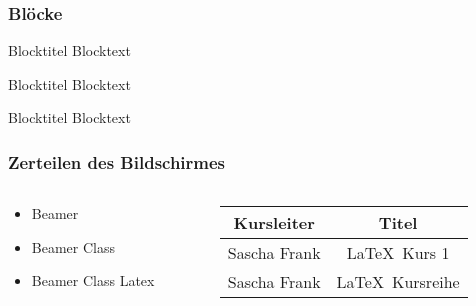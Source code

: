 \documentclass{beamer}
\begin{document}
\begin{frame}\frametitle{Bl\"ocke}

\begin{block}{Blocktitel}
Blocktext 
\end{block}

\begin{exampleblock}{Blocktitel}
Blocktext 
\end{exampleblock}


\begin{alertblock}{Blocktitel}
Blocktext 
\end{alertblock}
\end{frame}


\begin{frame}\frametitle{Zerteilen des Bildschirmes}
\begin{columns}
\begin{column}{5cm}
\begin{itemize}
\item Beamer 
\item Beamer Class 
\item Beamer Class Latex 
\end{itemize}
\end{column}
\begin{column}{5cm}
\begin{tabular}{|c|c|}
\hline
\textbf{Kursleiter} & \textbf{Titel} \\
\hline
Sascha Frank &  \LaTeX \ Kurs 1 \\
\hline
Sascha Frank & \LaTeX \ Kursreihe \\
\hline
\end{tabular}
\end{column}
\end{columns}
\end{frame}
\end{document}
